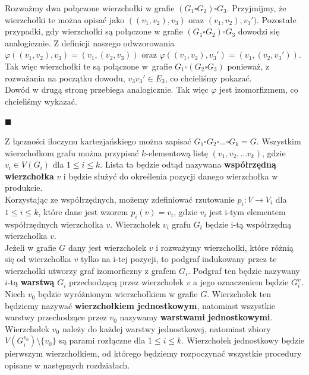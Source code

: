 \documentclass[12pt,a4paper,titlepage]{article}
\newcommand\tab[1][1cm]{\hspace*{#1}}
\begin{document}
\tab[0.6cm]Rozważmy dwa połączone wierzchołki w grafie $(G_1 \square G_2)\square G_3 $. Przyjmijmy, że wierzchołki te można opisać jako $((v_1, v_2), v_3)$ oraz $(v_1, v_2), v_3')$. Pozostałe przypadki, gdy wierzchołki są połączone w grafie $(G_1 \square G_2)\square G_3 $ dowodzi się analogicznie. Z definicji naszego odwzorowania $\varphi ((v_1, v_2), v_3) = (v_1, (v_2, v_3))$ oraz $\varphi ((v_1, v_2), v_3') = (v_1, (v_2, v_3'))$. Tak więc wierzchołki te są połączone w~grafie $G_1 \square (G_2 \square G_3) $ ponieważ, z rozważania na początku dowodu, $v_3 v_3' \in E_3$, co chcieliśmy pokazać.\\
\tab[0.6cm]Dowód w drugą stronę przebiega analogicznie. Tak więc $\varphi$ jest izomorfizmem, co chcieliśmy wykazać. 
\begin{flushright}
$\blacksquare$
\end{flushright}
\tab[0.6cm]Z łączności iloczynu kartezjańskiego można zapisać $G_1 \square G_2 \square ... \square G_k = G$. Wszystkim wierzchołkom grafu można przypisać $k$-elementową listę $(v_1, v_2 , ... v_k )$, gdzie $v_i \in V(G_i)$ dla $1 \leqslant i \leqslant k $. Lista ta będzie odtąd nazywana \textbf{współrzędną wierzchołka} $v$ i będzie służyć do określenia pozycji danego wierzchołka w produkcie. \\
\tab[0.6cm]Korzystając ze współrzędnych, możemy zdefiniować rzutowanie $p_i : V \rightarrow V_i $ dla $1 \leqslant i \leqslant k $, które dane jest wzorem $p_i (v) = v_i $, gdzie $v_i$ jest i-tym elementem współrzędnych wierzchołka $v$. Wierzchołek $v_i$ grafu $G_i$ będzie i-tą współrzędną wierzchołka $v$. \\
\tab[0.6cm]Jeżeli w grafie $G$ dany jest wierzchołek $v$ i rozważymy wierzchołki, które różnią się od wierzchołka $v$ tylko na i-tej pozycji, to podgraf indukowany przez te wierzchołki utworzy graf izomorficzny z grafem $G_i$. Podgraf ten będzie nazywany $i$-tą \textbf{warstwą} $G_i$ przechodzącą przez wierzchołek $v$ a jego oznaczeniem będzie $G_i ^v$.\\
\tab[0.6cm]Niech $v_0$ będzie wyróżnionym wierzchołkiem w grafie $G$. Wierzchołek ten będziemy nazywać \textbf{wierzchołkiem jednostkowym}, natomiast wszystkie warstwy przechodzące przez $v_0$ nazywamy \textbf{warstwami jednostkowymi}. Wierzchołek $v_0$ należy do każdej warstwy jednostkowej, natomiast zbiory $V(G_i ^{v_0}) \setminus \{v_0\}$ są parami rozłączne dla $1 \leqslant i \leqslant k $. Wierzchołek jednostkowy będzie pierwszym wierzchołkiem, od którego będziemy rozpoczynać wszystkie procedury opisane w następnych rozdziałach.\\
\end{document}
